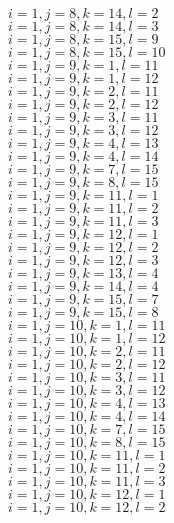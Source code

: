 \documentclass[14pt]{article}
\begin{document}
    $i=1,j=8,k=14,l=2 $ \\ 
    $i=1,j=8,k=14,l=3 $ \\ 
    $i=1,j=8,k=15,l=9 $ \\ 
    $i=1,j=8,k=15,l=10 $ \\ 
    $i=1,j=9,k=1,l=11 $ \\ 
    $i=1,j=9,k=1,l=12 $ \\ 
    $i=1,j=9,k=2,l=11 $ \\ 
    $i=1,j=9,k=2,l=12 $ \\ 
    $i=1,j=9,k=3,l=11 $ \\ 
    $i=1,j=9,k=3,l=12 $ \\ 
    $i=1,j=9,k=4,l=13 $ \\ 
    $i=1,j=9,k=4,l=14 $ \\ 
    $i=1,j=9,k=7,l=15 $ \\ 
    $i=1,j=9,k=8,l=15 $ \\ 
    $i=1,j=9,k=11,l=1 $ \\ 
    $i=1,j=9,k=11,l=2 $ \\ 
    $i=1,j=9,k=11,l=3 $ \\ 
    $i=1,j=9,k=12,l=1 $ \\ 
    $i=1,j=9,k=12,l=2 $ \\ 
    $i=1,j=9,k=12,l=3 $ \\ 
    $i=1,j=9,k=13,l=4 $ \\ 
    $i=1,j=9,k=14,l=4 $ \\ 
    $i=1,j=9,k=15,l=7 $ \\ 
    $i=1,j=9,k=15,l=8 $ \\ 
    $i=1,j=10,k=1,l=11 $ \\ 
    $i=1,j=10,k=1,l=12 $ \\ 
    $i=1,j=10,k=2,l=11 $ \\ 
    $i=1,j=10,k=2,l=12 $ \\ 
    $i=1,j=10,k=3,l=11 $ \\ 
    $i=1,j=10,k=3,l=12 $ \\ 
    $i=1,j=10,k=4,l=13 $ \\ 
    $i=1,j=10,k=4,l=14 $ \\ 
    $i=1,j=10,k=7,l=15 $ \\ 
    $i=1,j=10,k=8,l=15 $ \\ 
    $i=1,j=10,k=11,l=1 $ \\ 
    $i=1,j=10,k=11,l=2 $ \\ 
    $i=1,j=10,k=11,l=3 $ \\ 
    $i=1,j=10,k=12,l=1 $ \\ 
    $i=1,j=10,k=12,l=2 $ \\ 
\end{document}
